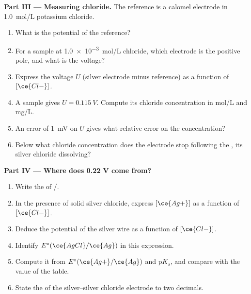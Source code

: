 \begin{problem}
\medskip
\noindent\textbf{Part III --- Measuring chloride.}
The reference is a calomel electrode in \qty{1.0}{mol/L} potassium
chloride.
\begin{enumerate}[resume]
  \item What is the potential of the reference?
  \item For a sample at \qty{1.0e-3}{mol/L} chloride, which electrode is
        the positive pole, and what is the voltage?
  \item Express the voltage $U$ (silver electrode minus reference) as a
        function of $[\ce{Cl-}]$.
  \item A sample gives $U = \qty{0.115}{V}$. Compute its chloride
        concentration in \unit{mol/L} and \unit{mg/L}.
  \item An error of \qty{1}{mV} on $U$ gives what relative error on the
        concentration?
  \item Below what chloride concentration does the electrode stop
        following the , its silver chloride dissolving?
\end{enumerate}

\medskip
\noindent\textbf{Part IV --- Where does 0.22 V come from?}
\begin{enumerate}[resume]
  \item Write the  of /.
  \item In the presence of solid silver chloride, express $[\ce{Ag+}]$ as a
        function of $[\ce{Cl-}]$.
  \item Deduce the potential of the silver wire as a function of
        $[\ce{Cl-}]$.
  \item Identify $E^\circ(\ce{AgCl}/\ce{Ag})$ in this expression.
  \item Compute it from $E^\circ(\ce{Ag+}/\ce{Ag})$ and $\mathrm{p}K_s$, and
        compare with the value of the table.
  \item State the  of the silver--silver chloride
        electrode to two decimals.
\end{enumerate}
\end{problem}
